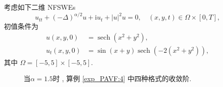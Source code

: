 	\begin{example}\label{exp_PAVF:4}
		
		考虑如下二维 NFSWEs
\begin{equation}
	u_{t t}+(-\Delta)^{\alpha / 2} u+\mathrm{i}  u_{t}+|u|^{2} u=0 , \quad (x , y , t) \in \Omega \times[0 , T],
\end{equation}
初值条件为
\begin{equation}
	\begin{aligned}
		u(x , y , 0)&=\operatorname{sech}\left(x^2+y^2\right) , \\
		u_t(x , y , 0)&=\sin (x+y) \operatorname{sech}\left(-2\left(x^2+y^2\right)\right)  , 
	\end{aligned}
\end{equation}
其中 $\Omega=[-5 , 5] \times[-5 , 5]$.
	
	\end{example}
		
		\begin{figure}[H]
			\begin{center}
			\caption{当$\alpha=1.5$时 , 算例 \ref{exp_PAVF:4}  中四种格式的收敛阶.}
			\label{fig_PAVF:7}
			\end{center}
			\end{figure}
		
